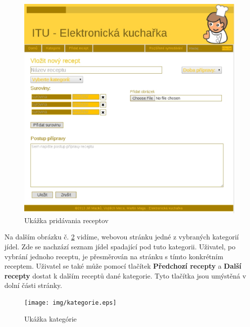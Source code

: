 \documentclass[12pt,a4paper,titlepage,final]{article}
\begin{document}
\begin{figure}

\begin{center}

\includegraphics[scale=0.7]{img/pridatrecept.eps} 
\caption{Ukážka pridávania receptov}
\label{pridani}

\end{center}

\end{figure}

Na dalším obrázku č. \ref{kategorie} vidíme, webovou stránku jedné z vybraných kategorií jídel. Zde se nachzází seznam jídel spadající pod tuto kategorii. Uživatel, po vybrání jednoho receptu, je přesměrován na stránku s tímto konkrétním receptem. Uživatel se také může pomocí tlačítek \textbf{Předchozí recepty} a \textbf{Další recepty} dostat k dalším receptů dané kategorie. Tyto tlačítka jsou umýstěná v dolní části stránky.\newline

\begin{figure}

\begin{center}

\texttt{[image: img/kategorie.eps]} 
\caption{Ukážka kategórie}
\label{kategorie}

\end{center}

\end{figure}
\end{document}
